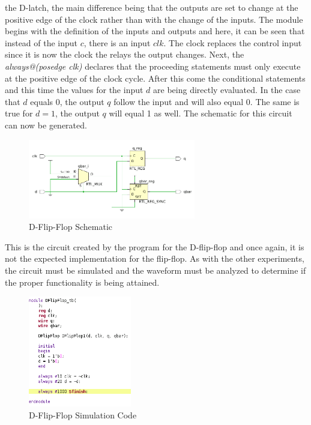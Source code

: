 \documentclass[12pt]{article}
\begin{document}
    the D-latch, the main difference being that the outputs are set to change at
    the positive edge of the clock rather than with the change of the inputs.
    The module begins with the definition of the inputs and outputs and here, it
    can be seen that instead of the input $c$, there is an input $clk$.  The
    clock replaces the control input since it is now the clock the relays the
    output changes. Next, the \textit{always@(posedge clk)} declares that the
    proceeding statements must only execute at the positive edge of the clock
    cycle. After this come the conditional statements and this time the values
    for the input $d$ are being directly evaluated. In the case that $d$ equals
    0, the output $q$ follow the input and will also equal 0. The same is true
    for $d=1$, the output $q$ will equal 1 as well. The schematic for this
    circuit can now be generated.
    \begin{figure}[h]
        \centering
        \includegraphics[width=0.65\textwidth]{DFlipFlop Schematic.png}
        \caption{D-Flip-Flop Schematic}
    \end{figure}
    \par This is the circuit created by the program for the D-flip-flop and once
    again, it is not the expected implementation for the flip-flop. As with the
    other experiments, the circuit must be simulated and the waveform must be
    analyzed to determine if the proper functionality is being attained.
    \begin{figure}[h]
        \centering
        \includegraphics[width=0.4\textwidth]{DFlipFlop Simulation Code.png}
        \caption{D-Flip-Flop Simulation Code}
    \end{figure}
\end{document}
